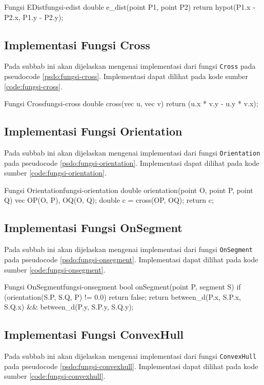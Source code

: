 \begin{code}[firstnumber=1]{Fungsi EDist}{fungsi-edist}
double e_dist(point P1, point P2){
	return hypot(P1.x - P2.x, P1.y - P2.y);
}
\end{code}

\subsection{ Implementasi Fungsi Cross}
Pada subbab ini akan dijelaskan mengenai implementasi dari fungsi \texttt{Cross} pada pseudocode \ref{psdo:fungsi-cross}. Implementasi dapat dilihat pada kode sumber \ref{code:fungsi-cross}.

\begin{code}[firstnumber=1]{Fungsi Cross}{fungsi-cross}
double cross(vec u, vec v){
	return (u.x * v.y - u.y * v.x);
}
\end{code}

\subsection{ Implementasi Fungsi Orientation}
Pada subbab ini akan dijelaskan mengenai implementasi dari fungsi \texttt{Orientation} pada pseudocode \ref{psdo:fungsi-orientation}. Implementasi dapat dilihat pada kode sumber \ref{code:fungsi-orientation}.

\begin{code}[firstnumber=1]{Fungsi Orientation}{fungsi-orientation}
double orientation(point O, point P, point Q){
	vec OP(O, P), OQ(O, Q);
	double c = cross(OP, OQ);
	return c;
}
\end{code}

\subsection{ Implementasi Fungsi OnSegment}
Pada subbab ini akan dijelaskan mengenai implementasi dari fungsi \texttt{OnSegment} pada pseudocode \ref{psdo:fungsi-onsegment}. Implementasi dapat dilihat pada kode sumber \ref{code:fungsi-onsegment}.

\begin{code}[firstnumber=1]{Fungsi OnSegment}{fungsi-onsegment}
bool onSegment(point P, segment S){
	if (orientation(S.P, S.Q, P) != 0.0)
		return false;
	return between_d(P.x, S.P.x, S.Q.x) && between_d(P.y, S.P.y, S.Q.y);
}
\end{code}

\subsection{ Implementasi Fungsi ConvexHull}
Pada subbab ini akan dijelaskan mengenai implementasi dari fungsi \texttt{ConvexHull} pada pseudocode \ref{psdo:fungsi-convexhull}. Implementasi dapat dilihat pada kode sumber \ref{code:fungsi-convexhull}.

